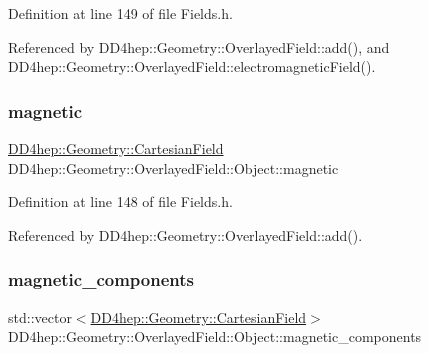Definition at line 149 of file Fields.\+h.



Referenced by D\+D4hep\+::\+Geometry\+::\+Overlayed\+Field\+::add(), and D\+D4hep\+::\+Geometry\+::\+Overlayed\+Field\+::electromagnetic\+Field().

\hypertarget{class_d_d4hep_1_1_geometry_1_1_overlayed_field_1_1_object_ad7154abfd06456e5530e93b29c2bab40}{}\label{class_d_d4hep_1_1_geometry_1_1_overlayed_field_1_1_object_ad7154abfd06456e5530e93b29c2bab40} 
\subsubsection{\texorpdfstring{magnetic}{magnetic}}
{\footnotesize\ttfamily \hyperlink{class_d_d4hep_1_1_geometry_1_1_cartesian_field}{D\+D4hep\+::\+Geometry\+::\+Cartesian\+Field} D\+D4hep\+::\+Geometry\+::\+Overlayed\+Field\+::\+Object\+::magnetic}



Definition at line 148 of file Fields.\+h.



Referenced by D\+D4hep\+::\+Geometry\+::\+Overlayed\+Field\+::add().

\hypertarget{class_d_d4hep_1_1_geometry_1_1_overlayed_field_1_1_object_ab56126a85338942dfac10260834e88a4}{}\label{class_d_d4hep_1_1_geometry_1_1_overlayed_field_1_1_object_ab56126a85338942dfac10260834e88a4} 
\subsubsection{\texorpdfstring{magnetic\+\_\+components}{magnetic\_components}}
{\footnotesize\ttfamily std\+::vector$<$\hyperlink{class_d_d4hep_1_1_geometry_1_1_cartesian_field}{D\+D4hep\+::\+Geometry\+::\+Cartesian\+Field}$>$ D\+D4hep\+::\+Geometry\+::\+Overlayed\+Field\+::\+Object\+::magnetic\+\_\+components}



